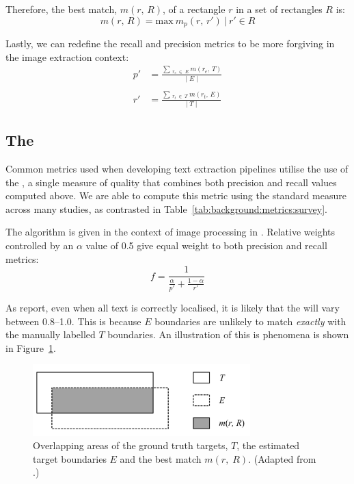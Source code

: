 Therefore, the best match, $m(r,\,R)$, of a rectangle $r$ in a set of rectangles $R$ is:
\begin{equation*}
  m(r,\,R) = \mathrm{max}~m_{p}(r,\,r')~|~r' \in R
\end{equation*}

Lastly, we can redefine the recall and precision metrics to be more forgiving in the image extraction context:
\begin{align*}
  p' &= \frac{\sum\,_{r_{e}\;\in\;E}~m(r_{e},\,T)}{\lvert\;E\;\rvert}\\ \\
  r' &= \frac{\sum\,_{r_{t}\;\in\;T}~m(r_{t},\,E)}{\lvert\;T\;\rvert}
\end{align*}

\subsection{The \fscore}
\label{sec:background:metrics:fscore}

Common metrics used when developing text extraction pipelines utilise the use of the \fscore, a single measure of quality that combines both precision and recall values computed above. We are able to compute this metric using the standard measure across many studies, as contrasted in Table~\ref{tab:background:metrics:survey}.

The \fscore{} algorithm is given in the context of image processing in \citet{Lucas:2003iw}. Relative weights controlled by an $\alpha$ value of 0.5 give equal weight to both precision and recall metrics:
\begin{equation*}
  f = \frac{1}{\frac{\alpha}{p'} + \frac{1-\alpha}{r'}}
\end{equation*}

As \citet{Chen:2011ul} report, even when all text is correctly localised, it is likely that the \fscore{} will vary between 0.8--1.0. This is because $E$ boundaries are unlikely to match \textit{exactly} with the manually labelled $T$ boundaries. An illustration of this is phenomena is shown in Figure~\ref{fig:background:metrics:ye2005_overlapping}.

\begin{figure}[h]
  \centering
  \includegraphics[width=0.75\textwidth]{images/background/ye2005_overlapping}
  \caption[Overlapping areas of ground truth and estimated targets]{Overlapping areas of the ground truth targets, $T$, the estimated target boundaries $E$ and the best match $m(r,\;R)$. (Adapted from \citep{Ye:2005wu}.)}
  \label{fig:background:metrics:ye2005_overlapping}
\end{figure}

